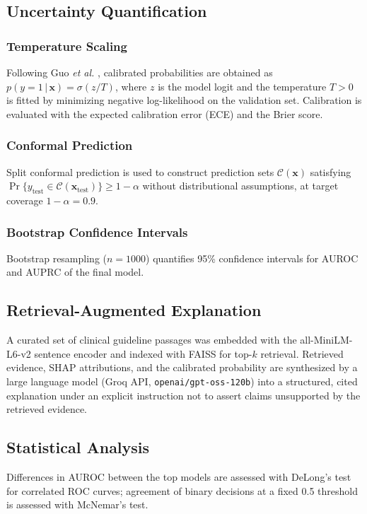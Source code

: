 \documentclass[12pt,onecolumn,journal]{IEEEtran}
\begin{document}
\subsection{Uncertainty Quantification}
\subsubsection{Temperature Scaling}
Following Guo \emph{et al.} \cite{guo2017calibration}, calibrated probabilities are obtained as $p(y{=}1\,|\,\mathbf{x})=\sigma(z/T)$, where $z$ is the model logit and the temperature $T>0$ is fitted by minimizing negative log-likelihood on the validation set. Calibration is evaluated with the expected calibration error (ECE) and the Brier score.

\subsubsection{Conformal Prediction}
Split conformal prediction \cite{vovk2005algorithmic,angelopoulos2021gentle} is used to construct prediction sets $\mathcal{C}(\mathbf{x})$ satisfying $\Pr\{y_{\mathrm{test}}\in\mathcal{C}(\mathbf{x}_{\mathrm{test}})\}\geq 1-\alpha$ without distributional assumptions, at target coverage $1-\alpha=0.9$.

\subsubsection{Bootstrap Confidence Intervals}
Bootstrap resampling ($n{=}1000$) quantifies 95\% confidence intervals for AUROC and AUPRC of the final model.

\subsection{Retrieval-Augmented Explanation}
A curated set of clinical guideline passages was embedded with the all-MiniLM-L6-v2 sentence encoder and indexed with FAISS for top-$k$ retrieval. Retrieved evidence, SHAP attributions, and the calibrated probability are synthesized by a large language model (Groq API, \texttt{openai/gpt-oss-120b}) into a structured, cited explanation under an explicit instruction not to assert claims unsupported by the retrieved evidence.

\subsection{Statistical Analysis}
Differences in AUROC between the top models are assessed with DeLong's test for correlated ROC curves; agreement of binary decisions at a fixed 0.5 threshold is assessed with McNemar's test.
\end{document}
